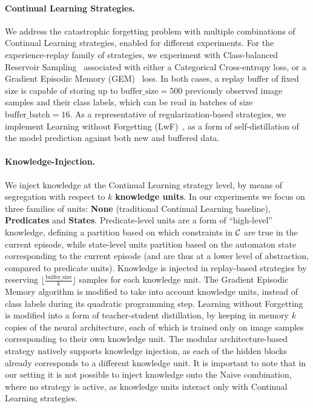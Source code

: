 \paragraph{Continual Learning Strategies.} We address the catastrophic forgetting problem with multiple combinations of Continual Learning strategies, enabled for different experiments. For the experience-replay family of strategies, we experiment with Class-balanced Reservoir Sampling~\cite{chrysakis2020online} associated with either a Categorical Cross-entropy loss, or a Gradient Episodic Memory (GEM)~\cite{lopez2017gradient} loss. In both cases, a replay buffer of fixed size is capable of storing up to $\text{buffer\_size} = 500$ previously observed image samples and their class labels, which can be read in batches of size $\text{buffer\_batch} = 16$. As a representative of regularization-based strategies, we implement Learning without Forgetting (LwF)~\cite{li2017learning}, as a form of self-distillation of the model prediction against both new and buffered data.

\paragraph{Knowledge-Injection.} We inject knowledge at the Continual Learning strategy level, by means of segregation with respect to $k$ \textbf{knowledge units}. In our experiments we focus on three families of units: \textbf{None} (traditional Continual Learning baseline), \textbf{Predicates} and \textbf{States}.
Predicate-level units are a form of ``high-level'' knowledge, defining a partition based on which constraints in ${\mathcal{C}}$ are true in the current episode, while state-level units partition based on the automaton state corresponding to the current episode (and are thus at a lower level of abstraction, compared to predicate units).
%
Knowledge is injected in replay-based strategies by reserving $\lfloor \frac{\text{buffer\_size}}{k}\rfloor$ samples for each knowledge unit. The Gradient Episodic Memory algorithm is modified to take into account knowledge units, instead of class labels during its quadratic programming step. 
Learning without Forgetting is modified into a form of teacher-student distillation, by keeping in memory $k$ copies of the neural architecture, each of which is trained only on image samples corresponding to their own knowledge unit.
The modular architecture-based strategy natively supports knowledge injection, as each of the hidden blocks already corresponds to a different knowledge unit.
%
It is important to note that in our setting it is not possible to inject knowledge onto the Naive combination, where no strategy is active, as knowledge units interact only with Continual Learning strategies.

